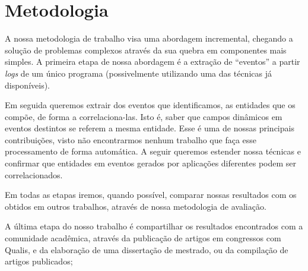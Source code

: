 \documentclass[
	12pt,				%
	openright,			%
	twoside,			%
	a4paper,			%
	english,			%
	spanish,			%
	brazil,				%
	]{abntex2}
\begin{document}
\section{Metodologia}

%
%
%
%

A nossa metodologia de trabalho visa uma abordagem incremental, chegando a solução de problemas complexos através da sua quebra em componentes mais simples. A primeira etapa de nossa abordagem é a extração de ``eventos'' a partir \emph{logs} de um único programa (possivelmente utilizando uma das técnicas já disponíveis).

Em seguida queremos extrair dos eventos que identificamos, as entidades que os compõe, de forma a correlaciona-las. Isto é, saber que campos dinâmicos em eventos destintos se referem a mesma entidade. Esse é uma de nossas principais contribuições, visto não encontrarmos nenhum trabalho que faça esse processamento de forma automática. A seguir queremos estender nossa técnicas e confirmar que entidades em eventos gerados por aplicações diferentes podem ser correlacionados.

Em todas as etapas iremos, quando possível, comparar nossas resultados com os obtidos em outros trabalhos, através de nossa metodologia de avaliação.

A última etapa do nosso trabalho é compartilhar os resultados encontrados com a comunidade acadêmica, através da publicação de artigos em congressos com Qualis, e  da elaboração de uma dissertação de mestrado, ou da compilação de artigos publicados;
\end{document}
